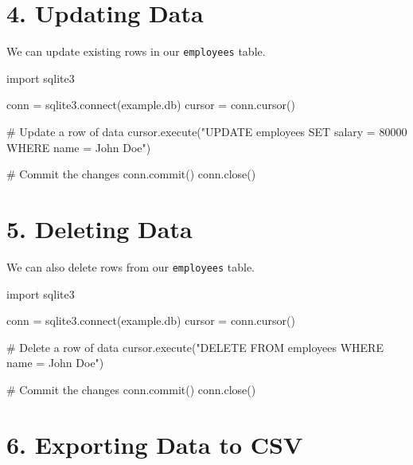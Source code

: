 \documentclass[
  letterpaper,
  DIV=11,
  numbers=noendperiod]{scrreprt}
\newenvironment{Shaded}{\begin{snugshade}}{\end{snugshade}}
\newcommand{\CommentTok}[1]{\textcolor[rgb]{0.37,0.37,0.37}{#1}}
\newcommand{\ExtensionTok}[1]{\textcolor[rgb]{0.00,0.23,0.31}{#1}}
\newcommand{\ImportTok}[1]{\textcolor[rgb]{0.00,0.46,0.62}{#1}}
\newcommand{\NormalTok}[1]{\textcolor[rgb]{0.00,0.23,0.31}{#1}}
\newcommand{\OperatorTok}[1]{\textcolor[rgb]{0.37,0.37,0.37}{#1}}
\newcommand{\StringTok}[1]{\textcolor[rgb]{0.13,0.47,0.30}{#1}}
\begin{document}
\section{4. Updating Data}\label{updating-data}

We can update existing rows in our \texttt{employees} table.

\begin{Shaded}
\begin{Highlighting}[]
\ImportTok{import}\NormalTok{ sqlite3}

\NormalTok{conn }\OperatorTok{=}\NormalTok{ sqlite3.}\ExtensionTok{connect}\NormalTok{(}\StringTok{\textquotesingle{}example.db\textquotesingle{}}\NormalTok{)}
\NormalTok{cursor }\OperatorTok{=}\NormalTok{ conn.cursor()}

\CommentTok{\# Update a row of data}
\NormalTok{cursor.execute(}\StringTok{"UPDATE employees SET salary = 80000 WHERE name = \textquotesingle{}John Doe\textquotesingle{}"}\NormalTok{)}

\CommentTok{\# Commit the changes}
\NormalTok{conn.commit()}
\NormalTok{conn.close()}
\end{Highlighting}
\end{Shaded}

\section{5. Deleting Data}\label{deleting-data}

We can also delete rows from our \texttt{employees} table.

\begin{Shaded}
\begin{Highlighting}[]
\ImportTok{import}\NormalTok{ sqlite3}

\NormalTok{conn }\OperatorTok{=}\NormalTok{ sqlite3.}\ExtensionTok{connect}\NormalTok{(}\StringTok{\textquotesingle{}example.db\textquotesingle{}}\NormalTok{)}
\NormalTok{cursor }\OperatorTok{=}\NormalTok{ conn.cursor()}

\CommentTok{\# Delete a row of data}
\NormalTok{cursor.execute(}\StringTok{"DELETE FROM employees WHERE name = \textquotesingle{}John Doe\textquotesingle{}"}\NormalTok{)}

\CommentTok{\# Commit the changes}
\NormalTok{conn.commit()}
\NormalTok{conn.close()}
\end{Highlighting}
\end{Shaded}

\section{6. Exporting Data to CSV}\label{exporting-data-to-csv}
\end{document}
